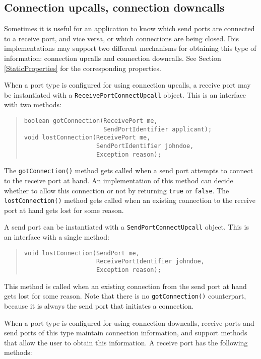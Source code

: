 \documentclass[10pt]{article}
\newcommand{\mysubsection}[1]{\subsection{#1}\label{#1}}
\begin{document}
\mysubsection{Connection upcalls, connection downcalls}

Sometimes it is useful for an application to know which send ports
are connected to a receive port, and vice versa, or which connections
are being closed.
Ibis implementations may support two different mechanisms for obtaining
this type of information: connection upcalls and connection downcalls.
See Section \ref{StaticProperties} for the corresponding properties.

When a port type is configured for using connection upcalls,
a receive port may be instantiated with a \texttt{ReceivePortConnectUpcall}
object. This is an interface with two methods:

\begin{quote}
\begin{verbatim}
boolean gotConnection(ReceivePort me,
                      SendPortIdentifier applicant);
void lostConnection(ReceivePort me,
                    SendPortIdentifier johndoe,
                    Exception reason);
\end{verbatim}
\end{quote}
\noindent 
The \texttt{gotConnection()} method gets called when a send port attempts
to connect to the receive port at hand.
An implementation of this method can decide whether
to allow this connection or not by returning \texttt{true} or \texttt{false}.
The \texttt{lostConnection()} method gets called when an existing connection
to the receive port at hand gets lost for some reason.

A send port can be instantiated with a
\texttt{SendPortConnectUpcall} object. This is an interface with a single method:

\begin{quote}
\begin{verbatim}
void lostConnection(SendPort me,
                    ReceivePortIdentifier johndoe,
                    Exception reason);
\end{verbatim}
\end{quote}
\noindent 
This method is called when an existing connection from the send port at
hand gets lost for some reason. Note that there is no \texttt{gotConnection()}
counterpart, because it is always the send port that initiates a connection.

When a port type is configured for using connection downcalls, receive ports
and send ports of this type maintain connection information, and support
methods that allow the user to obtain this information.
A receive port has the following methods:
\end{document}
